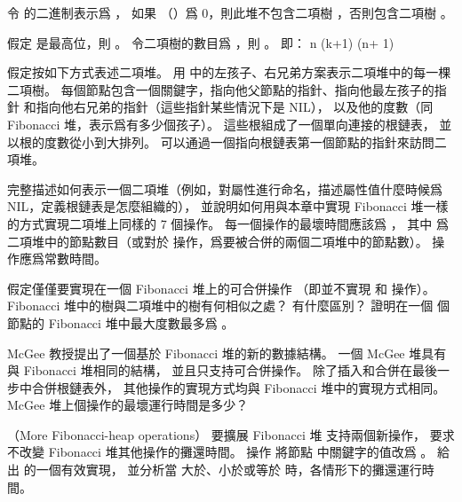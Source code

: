 \startANSWER
令  的二進制表示爲 ，
如果  （）爲 0，則此堆不包含二項樹 ，否則包含二項樹 。

假定  是最高位，則 。
令二項樹的數目爲 ，則 。
即：
\startformula
n \le (k+1) \le \lfloor (\lg n\rfloor + 1)
\stopformula
\stopANSWER

假定按如下方式表述二項堆。
用 中的左孩子、右兄弟方案表示二項堆中的每一棵二項樹。
每個節點包含一個關鍵字，指向他父節點的指針、指向他最左孩子的指針
和指向他右兄弟的指針（這些指針某些情況下是 NIL），
以及他的度數（同 Fibonacci 堆，表示爲有多少個孩子）。
這些根組成了一個單向連接的根鏈表，
並以根的度數從小到大排列。
可以通過一個指向根鏈表第一個節點的指針來訪問二項堆。

\startigBase[continue]\startitem
完整描述如何表示一個二項堆（例如，對屬性進行命名，描述屬性值什麼時候爲 NIL，定義根鏈表是怎麼組織的），
並說明如何用與本章中實現 Fibonacci 堆一樣的方式實現二項堆上同樣的 7 個操作。
每一個操作的最壞時間應該爲 ，
其中  爲二項堆中的節點數目（或對於  操作，爲要被合併的兩個二項堆中的節點數）。
  操作應爲常數時間。
\stopitem\stopigBase

\startANSWER
{}
\stopANSWER

\startigBase[continue]\startitem
假定僅僅要實現在一個 Fibonacci 堆上的可合併操作
（即並不實現  和  操作）。
 Fibonacci 堆中的樹與二項堆中的樹有何相似之處？
有什麼區別？
證明在一個  個節點的 Fibonacci 堆中最大度數最多爲 。
\stopitem\stopigBase

\startANSWER
{}
\stopANSWER

\startigBase[continue]\startitem
McGee 教授提出了一個基於 Fibonacci 堆的新的數據結構。
一個 McGee 堆具有與 Fibonacci 堆相同的結構，
並且只支持可合併操作。
除了插入和合併在最後一步中合併根鏈表外，
其他操作的實現方式均與 Fibonacci 堆中的實現方式相同。
 McGee 堆上個操作的最壞運行時間是多少？
\stopitem\stopigBase

\startANSWER
{}
\stopANSWER

\stopPROBLEM

\startPROBLEM
（More Fibonacci-heap operations）
要擴展 Fibonacci 堆  支持兩個新操作，
要求不改變 Fibonacci 堆其他操作的攤還時間。
\startigBase[a]\startitem
操作  將節點  中關鍵字的值改爲 。
給出  的一個有效實現，
並分析當  大於、小於或等於  時，各情形下的攤還運行時間。
\stopitem\stopigBase

